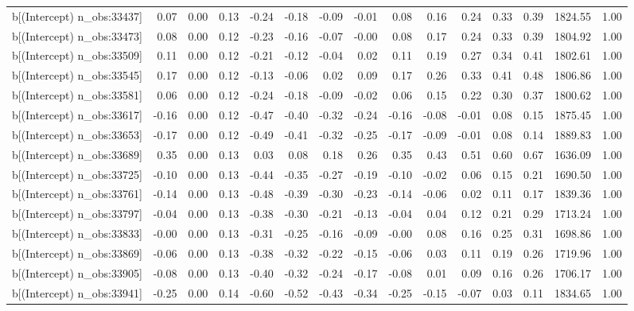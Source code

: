 \begin{table}[ht]
\begin{tabular}{rrrrrrrrrrrrrrr}
  b[(Intercept) n\_obs:33437] & 0.07 & 0.00 & 0.13 & -0.24 & -0.18 & -0.09 & -0.01 & 0.08 & 0.16 & 0.24 & 0.33 & 0.39 & 1824.55 & 1.00 \\ 
  b[(Intercept) n\_obs:33473] & 0.08 & 0.00 & 0.12 & -0.23 & -0.16 & -0.07 & -0.00 & 0.08 & 0.17 & 0.24 & 0.33 & 0.39 & 1804.92 & 1.00 \\ 
  b[(Intercept) n\_obs:33509] & 0.11 & 0.00 & 0.12 & -0.21 & -0.12 & -0.04 & 0.02 & 0.11 & 0.19 & 0.27 & 0.34 & 0.41 & 1802.61 & 1.00 \\ 
  b[(Intercept) n\_obs:33545] & 0.17 & 0.00 & 0.12 & -0.13 & -0.06 & 0.02 & 0.09 & 0.17 & 0.26 & 0.33 & 0.41 & 0.48 & 1806.86 & 1.00 \\ 
  b[(Intercept) n\_obs:33581] & 0.06 & 0.00 & 0.12 & -0.24 & -0.18 & -0.09 & -0.02 & 0.06 & 0.15 & 0.22 & 0.30 & 0.37 & 1800.62 & 1.00 \\ 
  b[(Intercept) n\_obs:33617] & -0.16 & 0.00 & 0.12 & -0.47 & -0.40 & -0.32 & -0.24 & -0.16 & -0.08 & -0.01 & 0.08 & 0.15 & 1875.45 & 1.00 \\ 
  b[(Intercept) n\_obs:33653] & -0.17 & 0.00 & 0.12 & -0.49 & -0.41 & -0.32 & -0.25 & -0.17 & -0.09 & -0.01 & 0.08 & 0.14 & 1889.83 & 1.00 \\ 
  b[(Intercept) n\_obs:33689] & 0.35 & 0.00 & 0.13 & 0.03 & 0.08 & 0.18 & 0.26 & 0.35 & 0.43 & 0.51 & 0.60 & 0.67 & 1636.09 & 1.00 \\ 
  b[(Intercept) n\_obs:33725] & -0.10 & 0.00 & 0.13 & -0.44 & -0.35 & -0.27 & -0.19 & -0.10 & -0.02 & 0.06 & 0.15 & 0.21 & 1690.50 & 1.00 \\ 
  b[(Intercept) n\_obs:33761] & -0.14 & 0.00 & 0.13 & -0.48 & -0.39 & -0.30 & -0.23 & -0.14 & -0.06 & 0.02 & 0.11 & 0.17 & 1839.36 & 1.00 \\ 
  b[(Intercept) n\_obs:33797] & -0.04 & 0.00 & 0.13 & -0.38 & -0.30 & -0.21 & -0.13 & -0.04 & 0.04 & 0.12 & 0.21 & 0.29 & 1713.24 & 1.00 \\ 
  b[(Intercept) n\_obs:33833] & -0.00 & 0.00 & 0.13 & -0.31 & -0.25 & -0.16 & -0.09 & -0.00 & 0.08 & 0.16 & 0.25 & 0.31 & 1698.86 & 1.00 \\ 
  b[(Intercept) n\_obs:33869] & -0.06 & 0.00 & 0.13 & -0.38 & -0.32 & -0.22 & -0.15 & -0.06 & 0.03 & 0.11 & 0.19 & 0.26 & 1719.96 & 1.00 \\ 
  b[(Intercept) n\_obs:33905] & -0.08 & 0.00 & 0.13 & -0.40 & -0.32 & -0.24 & -0.17 & -0.08 & 0.01 & 0.09 & 0.16 & 0.26 & 1706.17 & 1.00 \\ 
  b[(Intercept) n\_obs:33941] & -0.25 & 0.00 & 0.14 & -0.60 & -0.52 & -0.43 & -0.34 & -0.25 & -0.15 & -0.07 & 0.03 & 0.11 & 1834.65 & 1.00 \\ 

\end{tabular}
\end{table}
